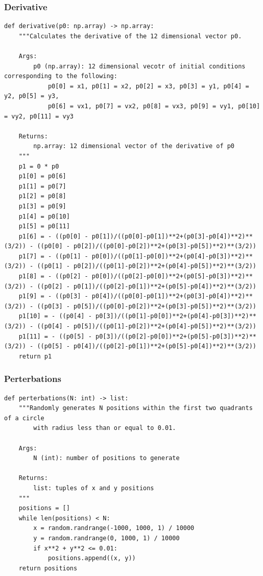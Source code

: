 \documentclass{article}
\begin{document}
\subsubsection{Derivative}
\begin{verbatim}
def derivative(p0: np.array) -> np.array:
    """Calculates the derivative of the 12 dimensional vector p0.

    Args:
        p0 (np.array): 12 dimensional vecotr of initial conditions corresponding to the following:
            p0[0] = x1, p0[1] = x2, p0[2] = x3, p0[3] = y1, p0[4] = y2, p0[5] = y3, 
            p0[6] = vx1, p0[7] = vx2, p0[8] = vx3, p0[9] = vy1, p0[10] = vy2, p0[11] = vy3 

    Returns:
        np.array: 12 dimensional vector of the derivative of p0
    """
    p1 = 0 * p0
    p1[0] = p0[6]
    p1[1] = p0[7]
    p1[2] = p0[8]
    p1[3] = p0[9]
    p1[4] = p0[10]
    p1[5] = p0[11]
    p1[6] = - ((p0[0] - p0[1])/((p0[0]-p0[1])**2+(p0[3]-p0[4])**2)**(3/2)) - ((p0[0] - p0[2])/((p0[0]-p0[2])**2+(p0[3]-p0[5])**2)**(3/2))
    p1[7] = - ((p0[1] - p0[0])/((p0[1]-p0[0])**2+(p0[4]-p0[3])**2)**(3/2)) - ((p0[1] - p0[2])/((p0[1]-p0[2])**2+(p0[4]-p0[5])**2)**(3/2))
    p1[8] = - ((p0[2] - p0[0])/((p0[2]-p0[0])**2+(p0[5]-p0[3])**2)**(3/2)) - ((p0[2] - p0[1])/((p0[2]-p0[1])**2+(p0[5]-p0[4])**2)**(3/2))
    p1[9] = - ((p0[3] - p0[4])/((p0[0]-p0[1])**2+(p0[3]-p0[4])**2)**(3/2)) - ((p0[3] - p0[5])/((p0[0]-p0[2])**2+(p0[3]-p0[5])**2)**(3/2))
    p1[10] = - ((p0[4] - p0[3])/((p0[1]-p0[0])**2+(p0[4]-p0[3])**2)**(3/2)) - ((p0[4] - p0[5])/((p0[1]-p0[2])**2+(p0[4]-p0[5])**2)**(3/2))
    p1[11] = - ((p0[5] - p0[3])/((p0[2]-p0[0])**2+(p0[5]-p0[3])**2)**(3/2)) - ((p0[5] - p0[4])/((p0[2]-p0[1])**2+(p0[5]-p0[4])**2)**(3/2))
    return p1
\end{verbatim}

\subsubsection{Perterbations}
\begin{verbatim}
def perterbations(N: int) -> list:
    """Randomly generates N positions within the first two quadrants of a circle 
        with radius less than or equal to 0.01.

    Args:
        N (int): number of positions to generate

    Returns:
        list: tuples of x and y positions
    """
    positions = []
    while len(positions) < N:
        x = random.randrange(-1000, 1000, 1) / 10000
        y = random.randrange(0, 1000, 1) / 10000
        if x**2 + y**2 <= 0.01:
            positions.append((x, y))
    return positions
\end{verbatim}
\end{document}
